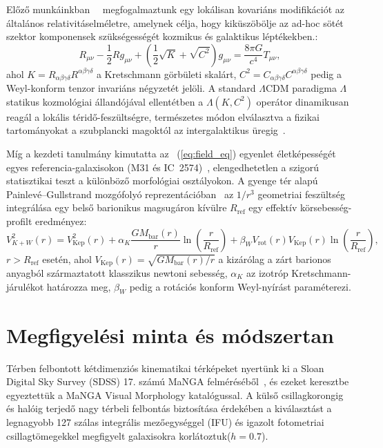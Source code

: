 \documentclass[11pt,a4paper]{article}
\begin{document}
Előző munkáinkban~\cite{Takacs2026}~\cite{Takacs2026b} megfogalmaztunk egy lokálisan kovariáns modifikációt az általános relativitáselméletre, amelynek célja, hogy kiküszöbölje az ad-hoc sötét szektor komponensek szükségességét kozmikus és galaktikus léptékekben.:
\begin{equation}
R_{\mu\nu} - \frac{1}{2} R g_{\mu\nu} + \left(\frac{1}{2}\sqrt{K} + \sqrt{C^2}\right) g_{\mu\nu} = \frac{8\pi G}{c^4} T_{\mu\nu},
\label{eq:field_eq}
\end{equation}
ahol $K = R_{\alpha\beta\gamma\delta}R^{\alpha\beta\gamma\delta}$ a Kretschmann görbületi skalárt, $C^2 = C_{\alpha\beta\gamma\delta}C^{\alpha\beta\gamma\delta}$ pedig a Weyl-konform tenzor invariáns négyzetét jelöli. A standard $\Lambda$CDM paradigma $\Lambda$ statikus kozmológiai állandójával ellentétben a $\Lambda(K, C^2)$ operátor dinamikusan reagál a lokális téridő-feszültségre, természetes módon elválasztva a fizikai tartományokat a szubplancki magoktól az intergalaktikus üregig~\cite{DESI2024}.

Míg a kezdeti tanulmány kimutatta az ~(\ref{eq:field_eq}) egyenlet életképességét egyes referencia-galaxisokon (M31 és IC~2574)~\cite{Takacs2026,Rubin1980}, elengedhetetlen a szigorú statisztikai teszt a különböző morfológiai osztályokon. A gyenge tér alapú Painlev\'e--Gullstrand mozgófolyó reprezentációban~\cite{Hamilton2008} az $1/r^3$ geometriai feszültség integrálása egy belső barionikus magsugáron kívülre $R_{\mathrm{ref}}$ egy effektív körsebesség-profilt eredményez:
\begin{equation}
V_{K+W}^2(r) = V_{\mathrm{Kep}}^2(r) + \alpha_K \frac{G M_{\mathrm{bar}}(r)}{r} \ln\!\left(\frac{r}{R_{\mathrm{ref}}}\right) + \beta_W V_{\mathrm{rot}}(r) V_{\mathrm{Kep}}(r) \ln\!\left(\frac{r}{R_{\mathrm{ref}}}\right),
\label{eq:vel_profile}
\end{equation}
$r > R_{\mathrm{ref}}$ esetén, ahol  $V_{\mathrm{Kep}}(r) = \sqrt{G M_{\mathrm{bar}}(r)/r}$ a kizárólag a zárt barionos anyagból származtatott klasszikus newtoni sebesség, $\alpha_K$ az izotróp Kretschmann-járulékot határozza meg, $\beta_W$ pedig a rotációs konform Weyl-nyírást paraméterezi.

\section{Megfigyelési minta és módszertan}

Térben felbontott kétdimenziós kinematikai térképeket nyertünk ki a Sloan Digital Sky Survey (SDSS) 17. számú MaNGA felméréséből~\cite{Bundy2015}, és ezeket keresztbe egyeztettük a MaNGA Visual Morphology katalógussal. A külső csillagkorongig és halóig terjedő nagy térbeli felbontás biztosítása érdekében a kiválasztást a legnagyobb 127 szálas integrális mezőegységgel (IFU) és igazolt fotometriai csillagtömegekkel megfigyelt galaxisokra korlátoztuk($h = 0.7$).
\end{document}
